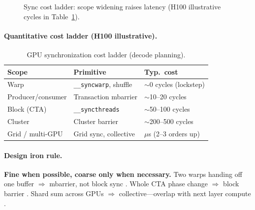 \begin{figure}[t]
\centering
{}
\caption{Sync cost ladder: scope widening raises latency (H100 illustrative cycles in Table~\ref{tab:ch09_sync_cost_ladder}).}
\label{fig:ch09_sync_cost_ladder}
\end{figure}

\paragraph{Quantitative cost ladder (H100 illustrative).}
\begin{table}[t]
\centering
\small
\caption{GPU synchronization cost ladder (decode planning).}
\label{tab:ch09_sync_cost_ladder}
\begin{tabular}{@{}lll@{}}
\toprule
\textbf{Scope} & \textbf{Primitive} & \textbf{Typ.\ cost} \\
\midrule
Warp & \texttt{\_\_syncwarp}, shuffle & ${\sim}$0 cycles (lockstep) \\
Producer/consumer & Transaction mbarrier & ${\sim}$10--20 cycles \\
Block (CTA) & \texttt{\_\_syncthreads} & ${\sim}$50--100 cycles \\
Cluster & Cluster barrier & ${\sim}$200--500 cycles \\
Grid / multi-GPU & Grid sync, collective & $\mu$s (2--3 orders up) \\
\bottomrule
\end{tabular}
\end{table}

\paragraph{Design iron rule.}
\textbf{Fine when possible, coarse only when necessary.} Two warps handing off one buffer $\Rightarrow$ mbarrier, not block sync \citep{shah2024flashattention3,semianalysis2024tma}.
Whole CTA phase change $\Rightarrow$ block barrier \citep{nvidia2022hopper}.
Shard sum across GPUs $\Rightarrow$ collective---overlap with next layer compute \citep{patel2025llminference,dlbook}.

